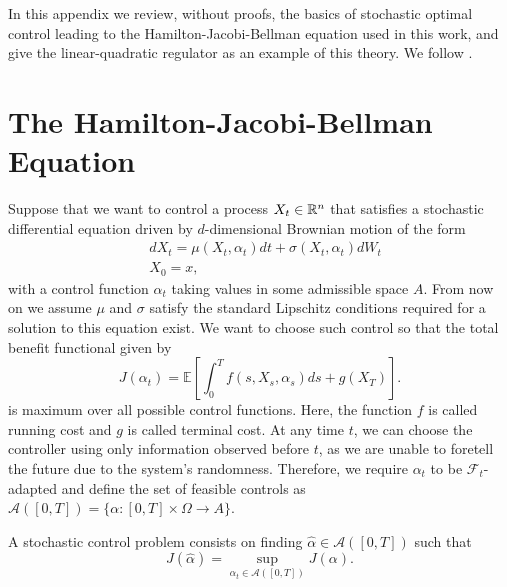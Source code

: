 \label{chp:ApendixStochasticControl}
\newtheorem{thm}{Theorem}[chapter]%
In this appendix we review, without proofs, the basics of stochastic optimal control leading to the Hamilton-Jacobi-Bellman equation used in this work, and give the linear-quadratic regulator as an example of this theory. We follow \cite{pham_continuous-time_2009}.
\section*{The Hamilton-Jacobi-Bellman Equation}
Suppose that we want to control a process $X_t\in \mathbb{R}^n$ that satisfies a stochastic differential equation driven by $d$-dimensional Brownian motion of the form 
\begin{equation}
	\begin{split}
		&dX_t=\mu(X_t,\alpha_t)dt+\sigma(X_t,\alpha_t)dW_t\\
		&X_0=x,
	\end{split}
\end{equation} 
with a control function $\alpha_t$ taking values in some admissible space $A$. From now on we assume $\mu$ and $\sigma$ satisfy the standard Lipschitz conditions required for a solution to this equation exist. We want to choose such control so that the total benefit functional given by 
\begin{equation}
	J(\alpha_t)=\mathbb{E}\left[\int_{0}^{T}f(s,X_s,\alpha_s) ds +g(X_T)\right].
\end{equation}
is maximum over all possible control functions. Here, the function $f$ is called running cost and $g$ is called terminal cost. At any time $t$, we can choose the controller using only information observed before $t$, as we are unable to foretell the future due to the system's randomness. Therefore, we require $\alpha_t$ to be $\mathcal{F}_t$-adapted and define the set of feasible controls as $\mathcal{A}([0,T])=\{\alpha:[0,T]\times \Omega\to A\}$.

A stochastic control problem consists on finding $\hat{\alpha}\in \mathcal{A}([0,T])$ such that
\begin{equation}
	J(\hat{\alpha})=\sup_{\alpha_t\in\mathcal{A}([0,T])} J(\alpha).
\end{equation}

